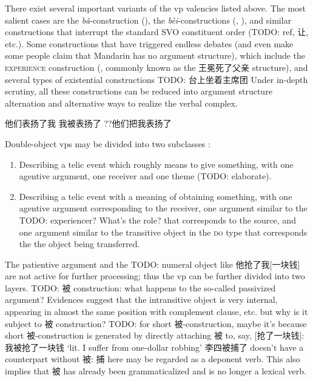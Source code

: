 \documentclass[UTF8, a4paper, oneside, scheme=plain, 12pt]{ctexrep}
\newcommand*{\citesec}[1]{\S~{#1}}
\newcommand{\form}[1]{\emph{#1}}
\newcommand{\translate}[1]{`#1'}
\newcommand*{\category}[1]{\textsc{#1}}
\begin{document}
There exist several important variants of the \acs{vp} valencies listed above.
The most salient cases are the \form{bǎ}-construction (),
the \form{bèi}-constructions 
(, 
),
and similar constructions that interrupt the standard SVO constituent order (TODO: ref, 让, etc.).
Some constructions that have triggered endless debates 
(and even make some people claim that Mandarin has no argument structure),
which include the \category{experience} construction 
(, commonly known as the 王冕死了父亲 structure),
and several types of existential constructions TODO: 台上坐着主席团
Under in-depth scrutiny, 
all these constructions can be reduced into argument structure alternation 
and alternative ways to realize the verbal complex.

\begin{exe}
    \ex 他们表扬了我
    \ex 我被表扬了
    \ex ??他们把我表扬了
\end{exe}


Double-object \acs{vp}s may be divided into 
two subclasses
\citep[\citesec{7.2}]{deng2010formal}:
\begin{enumerate}
    \item Describing a telic event which roughly means to give something, 
        with one agentive argument, 
        one receiver and one theme (TODO: elaborate).
    \item Describing a telic event with a meaning of obtaining something,
        with one agentive argument corresponding to the receiver, 
        one argument similar to the TODO: experiencer? What's the role? that corresponds to the source, 
        and one argument similar to the transitive object in the \category{do} type 
        that corresponds the the object being transferred.
\end{enumerate}

The patientive argument and the TODO: numeral object like 他抢了我[一块钱] 
are not active for further processing; 
thus the \acs{vp} can be further divided into two layers.
TODO: 被 construction: what happens to the so-called passivized argument?
Evidences suggest that the intransitive object is very internal, 
appearing in almost the same position with complement clause, etc.
but why is it subject to 被 construction? 
TODO: for short 被-construction, 
maybe it's because short 被-construction is generated by directly attaching 被 to, say, [抢了一块钱]: 
我被抢了一块钱 \translate{lit. I suffer from one-dollar robbing}
李四被捕了 doesn't have a counterpart without 被: 
捕 here may be regarded as a deponent verb. 
This also implies that 被 has already been grammaticalized 
and is no longer a lexical verb.
\end{document}
